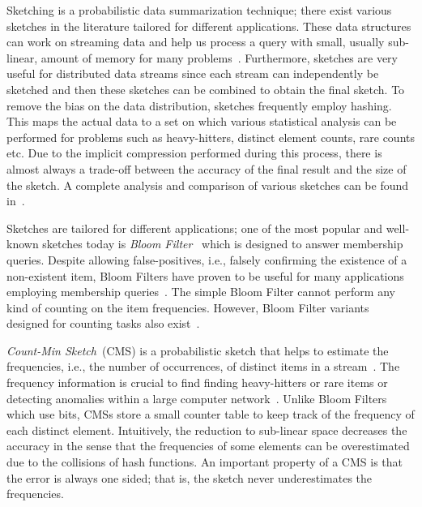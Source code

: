 \documentclass[10pt, review=true,sigconf]{acmart}
\begin{document}
Sketching is a probabilistic data summarization technique; there exist various sketches in the literature tailored for different applications. These data structures can work on streaming data and help us process a query with small, usually sub-linear, amount of memory for many problems~\cite{alon1996,charikar2002,dobra2002,gilbert2002}. Furthermore, sketches are very useful for distributed data streams since each stream can independently be sketched and then these sketches can be combined to obtain the final sketch. To remove the bias on the data distribution, sketches frequently employ hashing. This maps the actual data to a set on which various statistical analysis can be performed for problems such as heavy-hitters, distinct element counts, rare counts etc. Due to the implicit compression performed during this process, there is almost always a trade-off between the accuracy of the final result and the size of the sketch. A complete analysis and comparison of various sketches can be found in~\cite{cormode2005}.
	  
Sketches are tailored for different applications; one of the most popular and well-known sketches today is {\it Bloom Filter}~\cite{bloom1970} which is designed to answer membership queries. Despite allowing false-positives, i.e., falsely confirming the existence of a non-existent item, Bloom Filters have proven to be useful for many applications employing membership queries~\cite{broder2002}. The simple Bloom Filter cannot perform any kind of counting on the item frequencies. However, Bloom Filter variants designed for counting tasks also exist~\cite{Fan2000,Bonomi2006}.

{\it Count-Min Sketch}~(CMS) is a probabilistic sketch that helps to estimate the frequencies, i.e., the number of occurrences, of distinct items in a stream~\cite{cormode2005}. The frequency  information is crucial to find finding heavy-hitters or rare items or detecting anomalies within a large computer network~\cite{cormode2003, cormode2005}. Unlike Bloom Filters which use bits, CMSs store a small counter table to keep track of the frequency of each distinct element. Intuitively, the reduction to sub-linear space decreases the accuracy in the sense that the frequencies of some elements can be overestimated due to the collisions of hash functions. An important property of a CMS is that the error is always one sided; that is, the sketch never underestimates the frequencies. 
\end{document}
